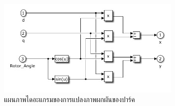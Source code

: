 \documentclass[11pt,a4paper]{article}
\begin{document}
\begin{figure}[H]
    \centering
    \includegraphics[width=0.8\textwidth]{park_inverse_trans.png}
    \caption{แผนภาพไดอะแกรมของการแปลงภาพผกผันของปาร์ค}
\end{figure}


\end{document}
